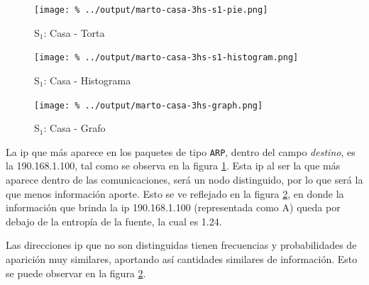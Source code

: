 \documentclass[final,inline,a4paper,narroweqnarray]{ieee}
\begin{document}
    \begin{figure}[ht]\begin{center}
      \texttt{[image: \%
      ../output/marto-casa-3hs-s1-pie.png]}
      \vspace{-2em}
      \caption{S$_1$: Casa - Torta}
      \label{marto-casa-3hs-s1-pie}
    \end{center}\end{figure}

    \begin{figure}[ht]\begin{center}
      \texttt{[image: \%
      ../output/marto-casa-3hs-s1-histogram.png]}
      \vspace{-2em}
      \caption{S$_1$: Casa - Histograma}
      \label{marto-casa-3hs-s1-histogram}
    \end{center}\end{figure}	

    \begin{figure}[ht]\begin{center}
      \texttt{[image: \%
      ../output/marto-casa-3hs-graph.png]}
      \vspace{-2em}
      \caption{S$_1$: Casa - Grafo}
      \label{marto-casa-3hs-graph}
    \end{center}\end{figure}	
  
  La ip que más aparece en los paquetes de tipo \texttt{ARP}, dentro del
  campo \textit{destino}, es la 190.168.1.100, tal como se observa en la
  figura \ref{marto-casa-3hs-s1-pie}. Esta ip al ser la que más aparece
  dentro de las comunicaciones, será un nodo distinguido, por lo que será la
  que menos información aporte. Esto se ve reflejado en la figura
  \ref{marto-casa-3hs-s1-histogram}, en donde la información que brinda la
  ip 190.168.1.100 (representada como A) queda por debajo de la entropía de
  la fuente, la cual es 1.24.  

  Las direcciones ip que no son distinguidas tienen frecuencias y
  probabilidades de aparición muy similares, aportando así
  cantidades similares de información. Esto se puede observar en la figura
  \ref{marto-casa-3hs-s1-histogram}.
\end{document}
